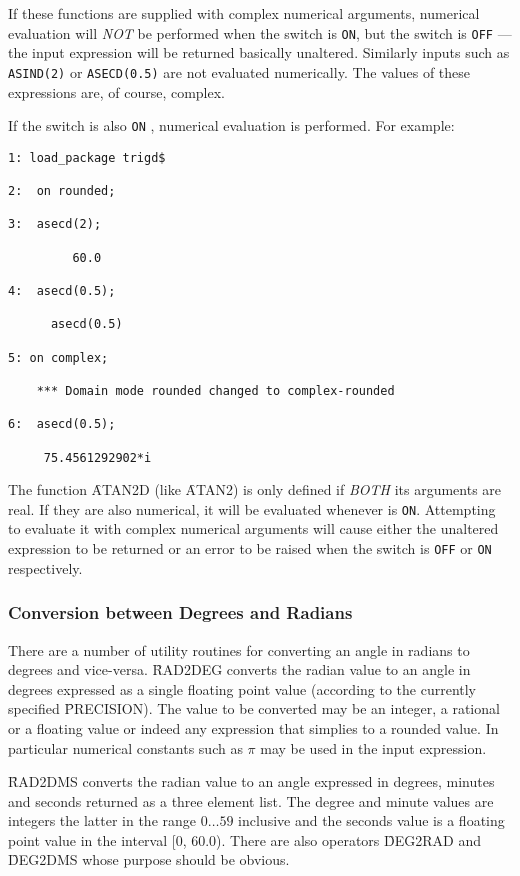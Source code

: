 If these functions are supplied with complex  numerical arguments, numerical evaluation will \emph{NOT} be performed when the switch  is \texttt{ON}, but the switch  is  \texttt{OFF} --- the input expression will be returned basically unaltered. Similarly inputs such as 
\texttt{ASIND(2)} or \texttt{ASECD(0.5)} are not evaluated numerically.  The values of these expressions are, of course, complex.

If the switch  is also \texttt{ON} , numerical evaluation is performed.  For example:
\begin{verbatim}
1: load_package trigd$

2:  on rounded;

3:  asecd(2);

         60.0

4:  asecd(0.5);

      asecd(0.5)

5: on complex;

    *** Domain mode rounded changed to complex-rounded

6:  asecd(0.5);

     75.4561292902*i

\end{verbatim}

The function \f{ATAN2D} (like \f{ATAN2}) is only defined if \emph{BOTH} its arguments are real. If they are also numerical, it will be evaluated whenever   is \texttt{ON}. Attempting to evaluate it with complex numerical arguments will cause either the unaltered expression to be returned or an error to be 
raised when the switch  is \texttt{OFF} or \texttt{ON} respectively.

\subsubsection{Conversion between Degrees and Radians}
There are a number of utility routines for converting an angle in radians to degrees and vice-versa.  \f{RAD2DEG} converts the radian value to  an angle in degrees expressed as a single floating point value (according to the currently specified \f{PRECISION}).  
The value to be converted may be an integer, a rational or a floating value or indeed any expression that simplies to a rounded value. In particular  numerical constants such as $\pi$ may be used in the input expression.

\f{RAD2DMS} converts the radian value to an angle expressed in degrees, minutes and seconds returned as a three element list.  The degree and minute values are integers the latter in the range $0 \ldots 59$ inclusive and the seconds value is  a floating point value in the interval [0, 60.0).
There are also operators \f{DEG2RAD} and \f{DEG2DMS} whose purpose should be obvious.

